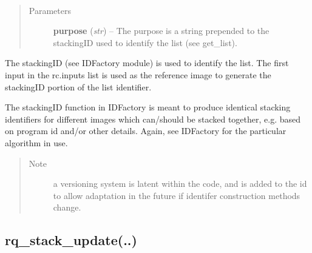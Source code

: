\documentclass[letterpaper,10pt,english]{sphinxmanual}
\begin{document}
\begin{fulllineitems}
\label{chapter_ReductionContextClass:astrodata.RecipeManager.ReductionContext.rq_stack_get}~\begin{quote}\begin{description}
\item[{Parameters}] \leavevmode
\textbf{purpose} (\emph{str}) -- The purpose is a string prepended to the stackingID
used to identify the list (see get\_list).

\end{description}\end{quote}

The stackingID (see IDFactory module) is used to identify the list.
The first input in the rc.inputs list is used as the reference image 
to generate  
the stackingID portion of the list identifier.

The stackingID function in IDFactory is meant to produce identical
stacking identifiers for different images which can/should be stacked 
together, e.g. based
on program id and/or other details.  Again, see IDFactory for the
particular algorithm in use.
\begin{quote}\begin{description}
\item[{Note }] \leavevmode
a versioning system is latent within the code, and is added
to the id to allow adaptation in the future if identifer construction
methods change.

\end{description}\end{quote}

\end{fulllineitems}



\subsection{rq\_stack\_update(..)}
\label{chapter_ReductionContextClass:rq-stack-update}
\end{document}
